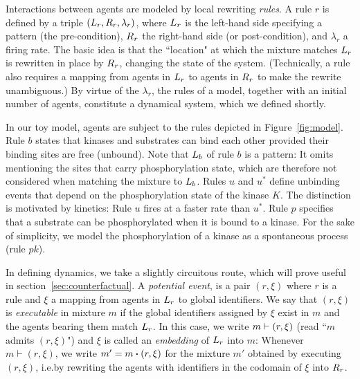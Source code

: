 

Interactions between agents are
modeled by local rewriting \emph{rules}.  A rule $r$ is defined by a
triple $(L_{r}, R_{r}, \lambda_r)$, where $L_{r}$ is the
left-hand side specifying a pattern (the pre-condition), $R_{r}$
the right-hand side (or post-condition), and $\lambda_r$ a firing rate.
The basic idea is that the ``location" at which the
mixture matches $L_{r}$ is rewritten in place by $R_{r}$, changing the
state of the system. (Technically, a rule also requires a mapping from
agents in $L_{r}$ to agents in $R_{r}$ to make the rewrite
unambiguous.) By virtue of the $\lambda_r$, the rules of a model,
together with an initial number of agents, constitute a dynamical
system, which we defined shortly.

In our toy model, agents are subject to the rules depicted in
Figure~\ref{fig:model}. Rule $b$ states that kinases and substrates
can bind each other provided their binding sites are free
(unbound). Note that $L_{b}$ of rule $b$ is a pattern: It omits
mentioning the sites that carry phosphorylation state, which are
therefore not considered when matching the
mixture to $L_{b}$. Rules $u$ and $u^{*}$ define unbinding events that depend on
the phosphorylation state of the kinase $K$. The distinction is
motivated by kinetics: Rule $u$ fires at a faster rate than $u^{*}$.
Rule $p$ specifies that a substrate can be phosphorylated when it is
bound to a kinase. For the sake of simplicity, we model the
phosphorylation of a kinase as a spontaneous process (rule $pk$).



In defining dynamics, we take a slightly circuitous route, which will
prove useful in section~\ref{sec:counterfactual}. A \emph{potential
  event}, is a pair $(r, \xi)$ where $r$ is a rule and $\xi$ a mapping
from agents in $L_{r}$ to global identifiers. We say that
$(r, \xi)$ is \emph{executable} in mixture $m$ if the global
identifiers assigned by $\xi$ exist in $m$ and the agents bearing them
match $L_{r}$. In this case, we write $m \vdash (r, \xi)$
(read ``$m$ admits $(r, \xi)$") and $\xi$ is called an
\emph{embedding} of $L_{r}$ into $m$:
Whenever $m \vdash (r, \xi)$, we write $m'=\UPDATE{m}{(r, \xi)}$ for
the mixture $m'$ obtained by executing $(r, \xi)$, i.e.\@ by rewriting
the agents with identifiers in the codomain of $\xi$ into $R_{r}$.

